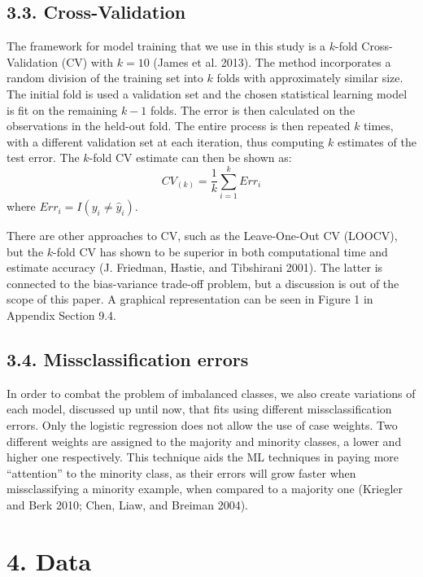 \documentclass[12pt,]{article}
\begin{document}
\hypertarget{cross-validation}{%
\subsection{3.3. Cross-Validation}\label{cross-validation}}

The framework for model training that we use in this study is a
\(k\)-fold Cross-Validation (CV) with \(k=10\) (James et al. 2013). The
method incorporates a random division of the training set into \(k\)
folds with approximately similar size. The initial fold is used a
validation set and the chosen statistical learning model is fit on the
remaining \(k-1\) folds. The error is then calculated on the
observations in the held-out fold. The entire process is then repeated
\(k\) times, with a different validation set at each iteration, thus
computing \(k\) estimates of the test error. The \(k\)-fold CV estimate
can then be shown as: \[CV_{(k)}=\frac{1}{k}\sum_{i=1}^{k}Err_i\] where
\(Err_i = I(y_i\neq \widehat{y}_i)\).

There are other approaches to CV, such as the Leave-One-Out CV (LOOCV),
but the \(k\)-fold CV has shown to be superior in both computational
time and estimate accuracy (J. Friedman, Hastie, and Tibshirani 2001).
The latter is connected to the bias-variance trade-off problem, but a
discussion is out of the scope of this paper. A graphical representation
can be seen in Figure 1 in Appendix Section 9.4.

\hypertarget{missclassification-errors}{%
\subsection{3.4. Missclassification
errors}\label{missclassification-errors}}

In order to combat the problem of imbalanced classes, we also create
variations of each model, discussed up until now, that fits using
different missclassification errors. Only the logistic regression does
not allow the use of case weights. Two different weights are assigned to
the majority and minority classes, a lower and higher one respectively.
This technique aids the ML techniques in paying more ``attention'' to
the minority class, as their errors will grow faster when
missclassifying a minority example, when compared to a majority one
(Kriegler and Berk 2010; Chen, Liaw, and Breiman 2004).

\hypertarget{data}{%
\section{4. Data}\label{data}}
\end{document}
